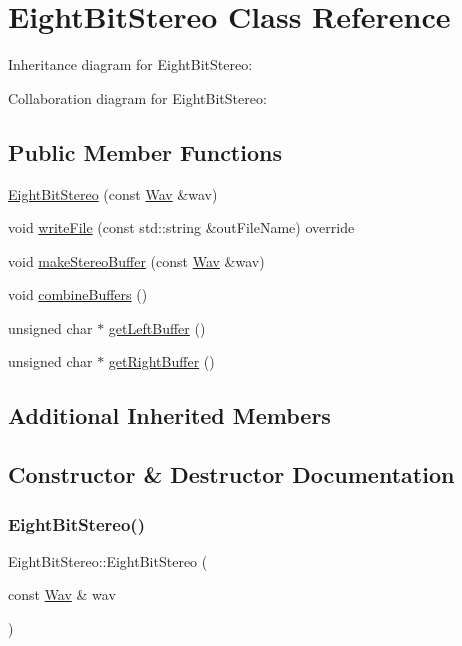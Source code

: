 \hypertarget{classEightBitStereo}{}\section{Eight\+Bit\+Stereo Class Reference}
\label{classEightBitStereo}


Inheritance diagram for Eight\+Bit\+Stereo\+:


Collaboration diagram for Eight\+Bit\+Stereo\+:
\subsection*{Public Member Functions}
\begin{DoxyCompactItemize}
\item 
\hyperlink{classEightBitStereo_a41153c5acf30d3805d7753bcd885ff53}{Eight\+Bit\+Stereo} (const \hyperlink{classWav}{Wav} \&wav)
\item 
void \hyperlink{classEightBitStereo_a5eb9c2b69034672b42662c0b50e54d64}{write\+File} (const std\+::string \&out\+File\+Name) override
\item 
void \hyperlink{classEightBitStereo_a1026484b3f96f2cee5177fa4157b94c8}{make\+Stereo\+Buffer} (const \hyperlink{classWav}{Wav} \&wav)
\item 
void \hyperlink{classEightBitStereo_a2012cb731c4a6ead9afbcfe0309df589}{combine\+Buffers} ()
\item 
unsigned char $\ast$ \hyperlink{classEightBitStereo_a02f9e38138558a3961a0e9ebae8777f8}{get\+Left\+Buffer} ()
\item 
unsigned char $\ast$ \hyperlink{classEightBitStereo_a261d17d0eea610c8929c5c2a814da8f5}{get\+Right\+Buffer} ()
\end{DoxyCompactItemize}
\subsection*{Additional Inherited Members}


\subsection{Constructor \& Destructor Documentation}
\mbox{\label{classEightBitStereo_a41153c5acf30d3805d7753bcd885ff53}} 
\subsubsection{\texorpdfstring{Eight\+Bit\+Stereo()}{EightBitStereo()}}
{\footnotesize\ttfamily Eight\+Bit\+Stereo\+::\+Eight\+Bit\+Stereo (\begin{DoxyParamCaption}\item[{const \hyperlink{classWav}{Wav} \&}]{wav }\end{DoxyParamCaption})}

